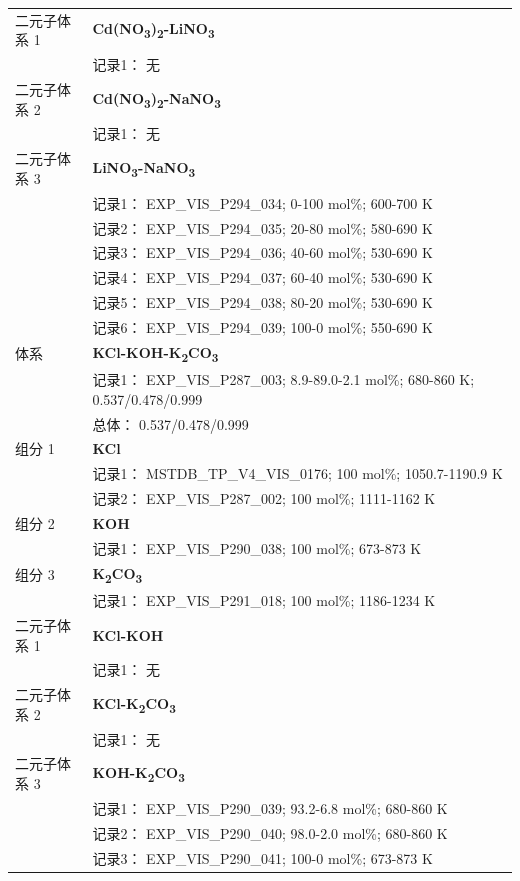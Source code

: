 \documentclass[12pt]{article}
\begin{document}
{\begin{longtable}[]{@{}
  >{\raggedright\arraybackslash}p{}
  >{\raggedright\arraybackslash}p{}@{}}
二元子体系 1 & \textbf{Cd(NO\textsubscript{3})\textsubscript{2}-LiNO\textsubscript{3}} \\
 & 记录1： 无 \\
二元子体系 2 & \textbf{Cd(NO\textsubscript{3})\textsubscript{2}-NaNO\textsubscript{3}} \\
 & 记录1： 无 \\
二元子体系 3  & \textbf{LiNO\textsubscript{3}-NaNO\textsubscript{3}} \\
 & 记录1： EXP\_VIS\_P294\_034; 0-100 mol\%; 600-700 K \\
 & 记录2： EXP\_VIS\_P294\_035; 20-80 mol\%; 580-690 K \\
 & 记录3： EXP\_VIS\_P294\_036; 40-60 mol\%; 530-690 K \\
 & 记录4： EXP\_VIS\_P294\_037; 60-40 mol\%; 530-690 K \\
 & 记录5： EXP\_VIS\_P294\_038; 80-20 mol\%; 530-690 K \\
 & 记录6： EXP\_VIS\_P294\_039; 100-0 mol\%; 550-690 K  \\

\midrule
体系 & \textbf{KCl-KOH-K\textsubscript{2}CO\textsubscript{3}} \\
 & 记录1： EXP\_VIS\_P287\_003; 8.9-89.0-2.1 mol\%; 680-860 K; 0.537/0.478/0.999 \\
 & 总体： 0.537/0.478/0.999  \\

组分 1  & \textbf{KCl} \\
 & 记录1： MSTDB\_TP\_V4\_VIS\_0176; 100 mol\%; 1050.7-1190.9 K \\
 & 记录2： EXP\_VIS\_P287\_002; 100 mol\%; 1111-1162 K  \\

组分 2  & \textbf{KOH} \\
 & 记录1： EXP\_VIS\_P290\_038; 100 mol\%; 673-873 K  \\

组分 3  & \textbf{K\textsubscript{2}CO\textsubscript{3}} \\
 & 记录1： EXP\_VIS\_P291\_018; 100 mol\%; 1186-1234 K  \\

二元子体系 1 & \textbf{KCl-KOH} \\
 & 记录1： 无 \\
二元子体系 2 & \textbf{KCl-K\textsubscript{2}CO\textsubscript{3}} \\
 & 记录1： 无 \\
二元子体系 3  & \textbf{KOH-K\textsubscript{2}CO\textsubscript{3}} \\
 & 记录1： EXP\_VIS\_P290\_039; 93.2-6.8 mol\%; 680-860 K \\
 & 记录2： EXP\_VIS\_P290\_040; 98.0-2.0 mol\%; 680-860 K \\
 & 记录3： EXP\_VIS\_P290\_041; 100-0 mol\%; 673-873 K  \\


\end{longtable}}
\end{document}
